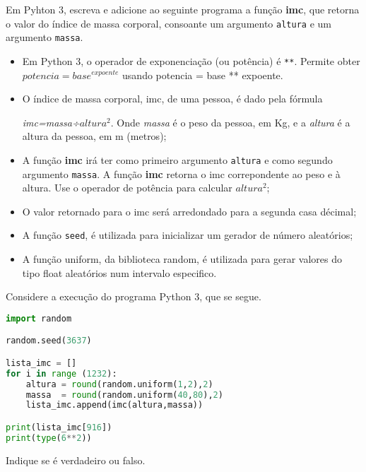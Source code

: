 \documentclass[12pt,varwidth=16cm,border=17pt]{standalone}
\begin{document}
Em Pyhton 3, escreva e adicione ao seguinte programa a função \textbf{imc}, que retorna o valor do índice de massa corporal, consoante um argumento \verb+altura+ e um argumento \verb+massa+.
\begin{itemize}
    
  \item Em Python 3, o operador de exponenciação (ou potência) é \verb+**+. Permite obter $potencia=base^{expoente}$ usando potencia = base ** expoente.
  
  
  
  \item  O índice de massa corporal, imc, de uma pessoa, é dado pela fórmula

  \emph{imc=massa÷$altura^2$}. Onde \emph{massa} é o peso da pessoa, em Kg, e a \emph{altura} é a altura da pessoa, em m (metros);
  \item A função \textbf{imc} irá ter como primeiro argumento \verb+altura+ e como segundo argumento \verb+massa+. A função \textbf{imc} retorna o imc correpondente ao peso e à altura. Use o operador de potência para calcular $altura^2$;
  \item O valor retornado para o imc será arredondado para a segunda casa décimal;
  \item A função \verb+seed+, é utilizada para inicializar um gerador de número aleatórios;
  \item A função uniform, da biblioteca random, é utilizada para gerar valores do tipo float aleatórios num intervalo especifico.
  
  

    
\end{itemize}




Considere a execução do programa Python 3, que se segue. 

\begin{lstlisting}[language=Python]
import random

random.seed(3637)

lista_imc = []
for i in range (1232):
    altura = round(random.uniform(1,2),2)
    massa  = round(random.uniform(40,80),2)
    lista_imc.append(imc(altura,massa))

print(lista_imc[916])
print(type(6**2))
\end{lstlisting}

Indique se é verdadeiro ou falso.
\end{document}
